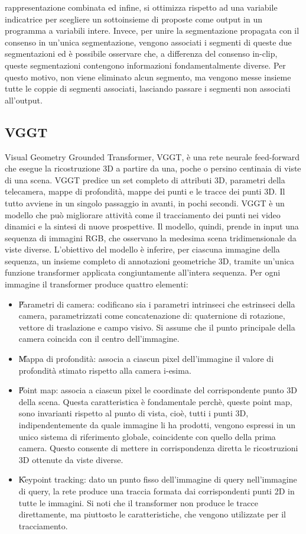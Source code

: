 rappresentazione combinata ed infine, si ottimizza rispetto ad una variabile indicatrice per scegliere un sottoinsieme di proposte come output in un programma a variabili intere. Invece, per unire la segmentazione propagata con il consenso in un'unica segmentazione, vengono associati i segmenti di queste due segmentazioni ed è possibile osservare che, a differenza del consenso in-clip, queste segmentazioni contengono informazioni fondamentalmente diverse. Per questo motivo, non viene eliminato alcun segmento, ma vengono messe insieme tutte le coppie di segmenti associati, lasciando passare i segmenti non associati all'output. \cite{deva}
\subsection{VGGT}
Visual Geometry Grounded Transformer, VGGT, è una rete neurale feed-forward che esegue la ricostruzione 3D a partire da una, poche o persino centinaia di viste di una scena. VGGT predice un set completo di attributi 3D, parametri della telecamera, mappe di profondità, mappe dei punti e le tracce dei punti 3D. Il tutto avviene in un singolo passaggio in avanti, in pochi secondi. VGGT è un modello che può migliorare attività come il tracciamento dei punti nei video dinamici e la sintesi di nuove prospettive. Il modello, quindi, prende in input una sequenza di immagini RGB, che osservano la medesima scena tridimensionale da viste diverse. L'obiettivo del modello è inferire, per ciascuna immagine della sequenza, un insieme completo di annotazioni geometriche 3D, tramite un'unica funzione transformer applicata congiuntamente all'intera sequenza. Per ogni immagine il transformer produce quattro elementi:
\begin{itemize}
    \item \U{Parametri di camera}: codificano sia i parametri intrinseci che estrinseci della camera, parametrizzati come concatenazione di: quaternione di rotazione, vettore di traslazione e campo visivo. Si assume che il punto principale della camera coincida con il centro dell'immagine.
    \item \U{Mappa di profondità}: associa a ciascun pixel dell'immagine il valore di profondità stimato rispetto alla camera i-esima.
    \item \U{Point map}: associa a ciascun pixel le coordinate del corrispondente punto 3D della scena. Questa caratteristica è fondamentale perchè, queste point map, sono invarianti rispetto al punto di vista, cioè, tutti i punti 3D, indipendentemente da quale immagine li ha prodotti, vengono espressi in un unico sistema di riferimento globale, coincidente con quello della prima camera. Questo consente di mettere in corrispondenza diretta le ricostruzioni 3D ottenute da viste diverse.
    \item \U{Keypoint tracking}: dato un punto fisso dell'immagine di query nell'immagine di query, la rete produce una traccia formata dai corrispondenti punti 2D in tutte le immagini. Si noti che il transformer non produce le tracce direttamente, ma piuttosto le caratteristiche, che vengono utilizzate per il tracciamento.
\end{itemize}
